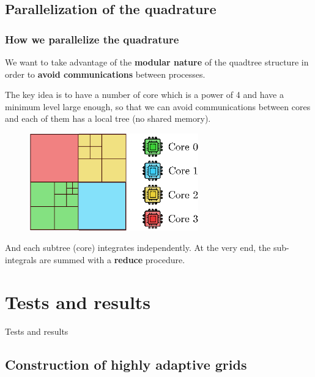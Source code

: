 \documentclass[8pt]{beamer}
\begin{document}
\subsection{Parallelization of the quadrature}
\begin{frame}
\frametitle{How we parallelize the quadrature}\pause
We want to take advantage of the \textbf{modular nature} of the quadtree structure in order to \textbf{avoid communications} between processes.
\pause

The key idea is to have a number of core which is a power of 4 and have a minimum level large enough, so that we can avoid communications between cores and each of them has a local tree (no shared memory).
 \begin{figure}[!h]
\begin{center}
\includegraphics[width=0.65\textwidth]{./figures/parallel_integration.eps}
\end{center}
\end{figure}

And each subtree (core) integrates independently. At the very end, the sub-integrals are summed with a \textbf{reduce} procedure.
\end{frame}

\section{Tests and results}
\begin{frame}
 \begin{center}
  \begin{huge}
   Tests and results
  \end{huge}
 \end{center}
\end{frame}

\subsection{Construction of highly adaptive grids}
\end{document}
